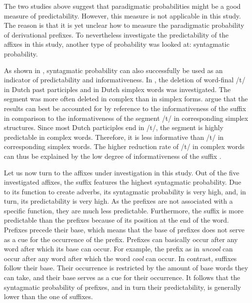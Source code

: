 { 
The two studies above suggest that paradigmatic probabilities might be a good measure of predictability. However, this measure is not applicable in this study. The reason is that it is yet unclear how to measure the paradigmatic probability of derivational prefixes. 
 To nevertheless investigate the predictability of the affixes in this study, 
another type of probability was looked at: syntagmatic probability. 

As shown in \cite{Hanique.06.03.2013}, syntagmatic probability can also successfully be used as an indicator of predictability and informativeness. In \cite{Hanique.06.03.2013}, the deletion of word-final /t/ in Dutch past participles and in Dutch simplex words was investigated.  The segment was more often deleted in complex than in simplex forms. 
  \cite{Hanique.2012}  argue that the results can best be accounted for by reference to the informativeness of the suffix  in comparison to the informativeness of the segment /t/ in corresponding simplex structures. Since most Dutch participles end in /t/, the segment is highly predictable in complex words. Therefore, it is less informative than /t/ in corresponding simplex words. The higher reduction rate of /t/ in complex words can thus be explained by the low degree of informativeness of the suffix .
  
  
Let us now turn to the affixes under investigation in this study. Out of the five investigated affixes, the suffix  features the highest syntagmatic probability. Due to its function to create adverbs, its syntagmatic probability is very high, and, in turn, its predictability is very high. As the prefixes are not associated with a specific function, they are much less predictable.  
Furthermore, the suffix  is more predictable than the prefixes because of its position at the end of the word. 
 Prefixes precede their base, which means that the base of prefixes does not serve as a cue for the occurrence of the prefix. Prefixes can basically occur after any word after which its base can occur. 
 For example, the prefix  as in \textit{uncool} can occur after any word after which the word \textit{cool} can occur. 
 In contrast, suffixes follow their base. Their occurrence is restricted by the amount of base words they can take,  and their base serves as a cue for their occurrence.
 It follows that the syntagmatic probability of prefixes, and in turn their predictability, is generally lower than the one of suffixes. 
 
}
